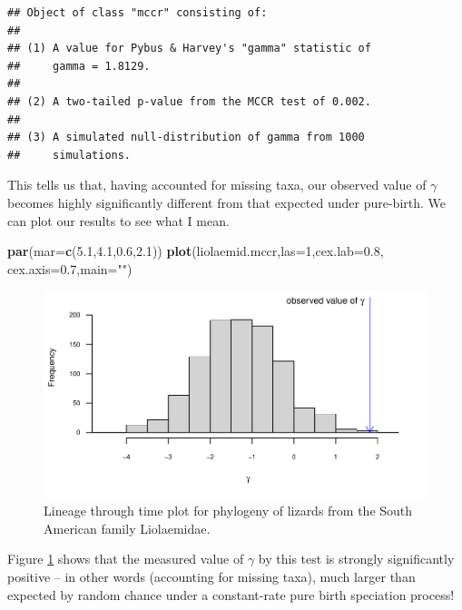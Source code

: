 \documentclass[fleqn,10pt,lineno]{wlpeerj} %
\newenvironment{Shaded}{\begin{snugshade}}{\end{snugshade}}
\newcommand{\AttributeTok}[1]{\textcolor[rgb]{0.13,0.29,0.53}{#1}}
\newcommand{\DecValTok}[1]{\textcolor[rgb]{0.00,0.00,0.81}{#1}}
\newcommand{\FloatTok}[1]{\textcolor[rgb]{0.00,0.00,0.81}{#1}}
\newcommand{\FunctionTok}[1]{\textcolor[rgb]{0.13,0.29,0.53}{\textbf{#1}}}
\newcommand{\NormalTok}[1]{#1}
\newcommand{\StringTok}[1]{\textcolor[rgb]{0.31,0.60,0.02}{#1}}
\begin{document}
\begin{verbatim}
## Object of class "mccr" consisting of:
## 
## (1) A value for Pybus & Harvey's "gamma" statistic of 
##     gamma = 1.8129.
## 
## (2) A two-tailed p-value from the MCCR test of 0.002.
## 
## (3) A simulated null-distribution of gamma from 1000
##     simulations.
\end{verbatim}

This tells us that, having accounted for missing taxa, our observed value of \(\gamma\) becomes highly significantly different from that expected under pure-birth. We can plot our results to see what I mean.

\begin{Shaded}
\begin{Highlighting}[]
\FunctionTok{par}\NormalTok{(}\AttributeTok{mar=}\FunctionTok{c}\NormalTok{(}\FloatTok{5.1}\NormalTok{,}\FloatTok{4.1}\NormalTok{,}\FloatTok{0.6}\NormalTok{,}\FloatTok{2.1}\NormalTok{))}
\FunctionTok{plot}\NormalTok{(liolaemid.mccr,}\AttributeTok{las=}\DecValTok{1}\NormalTok{,}\AttributeTok{cex.lab=}\FloatTok{0.8}\NormalTok{,}
  \AttributeTok{cex.axis=}\FloatTok{0.7}\NormalTok{,}\AttributeTok{main=}\StringTok{""}\NormalTok{)}
\end{Highlighting}
\end{Shaded}

\begin{figure}
\includegraphics[width=1\linewidth]{Revell.phytools-v2_peerj_files/figure-latex/liol-mccr-1} \caption{Lineage through time plot for phylogeny of lizards from the South American family Liolaemidae.}\label{fig:liol-mccr}
\end{figure}

Figure \ref{fig:liol-mccr} shows that the measured value of \(\gamma\) by this test is strongly significantly positive -- in other words (accounting for missing taxa), much larger than expected by random chance under a constant-rate pure birth speciation process!
\end{document}
